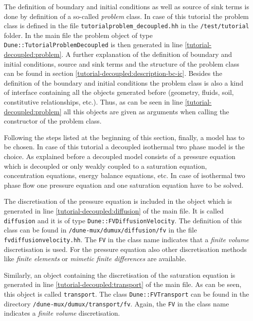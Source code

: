 The definition of boundary and initial conditions as well as source of sink terms is done by definition of a so-called \textit{problem} class. In case of this tutorial the problem class is defined in the file \texttt{tutorialproblem\_decoupled.hh} in the \texttt{/test/tutorial} folder. In the main file the problem object of type \texttt{Dune::TutorialProblemDecoupled} is then generated in line \ref{tutorial-decoupled:problem}. A further explanation of the definition of boundary and initial conditions, source and sink terms and the structure of the problem class can be found in section \ref{tutorial-decoupled:description-bc-ic}. Besides the definition of the boundary and initial conditions the problem class is also a kind of interface containing all the objects generated before (geometry, fluids, soil, constitutive relationships, etc.). Thus, as can be seen in line \ref{tutorial-decoupled:problem} all this objects are given as arguments when calling the constructor of the problem class.

Following the steps listed at the beginning of this section, finally, a model has to be chosen. In case of this tutorial a decoupled isothermal two phase model is the choice. As explained before a decoupled model consists of a pressure equation which is decoupled or only weakly coupled to a saturation equation, concentration equations, energy balance equations, etc. In case of isothermal two phase flow one pressure equation and one saturation equation have to be solved. 

The discretisation of the pressure equation is included in the object which is generated in line \ref{tutorial-decoupled:diffusion} of the main file. It is called \texttt{diffusion} and it is of type \texttt{Dune::FVDiffusionVelocity}. The definition of this class can be found in \texttt{/dune-mux/dumux/diffusion/fv} in the file \texttt{fvdiffusionvelocity.hh}. The \texttt{FV} in the class name indicates that a \textit{finite volume} discretisation is used. For the pressure equation also other discretisation methods like \textit{finite elements} or \textit{mimetic finite differences} are available.

Similarly, an object containing the discretisation of the saturation equation is generated in line \ref{tutorial-decoupled:transport} of the main file. As can be seen, this object is called \texttt{transport}. The class  \texttt{Dune::FVTransport} can be found in the directory \texttt{/dune-mux/dumux/transport/fv}. Again, the \texttt{FV} in the class name indicates a \textit{finite volume} discretisation.


